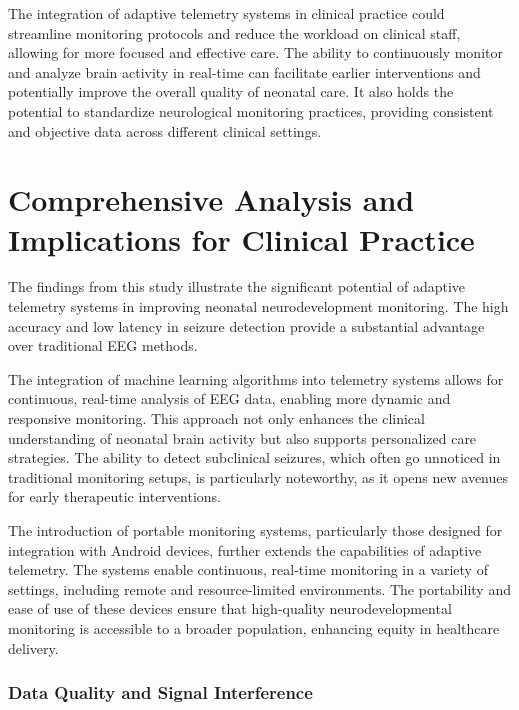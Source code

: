 \documentclass[12pt,journal,compsoc]{IEEEtran}
\begin{document}
The integration of adaptive telemetry systems in clinical practice could streamline monitoring protocols and reduce the workload on clinical staff, allowing for more focused and effective care. The ability to continuously monitor and analyze brain activity in real-time can facilitate earlier interventions and potentially improve the overall quality of neonatal care. It also holds the potential to standardize neurological monitoring practices, providing consistent and objective data across different clinical settings. 

\section{Comprehensive Analysis and Implications for Clinical Practice}

The findings from this study illustrate the significant potential of adaptive telemetry systems in improving neonatal neurodevelopment monitoring. The high accuracy and low latency in seizure detection provide a substantial advantage over traditional EEG methods.  

The integration of machine learning algorithms into telemetry systems allows for continuous, real-time analysis of EEG data, enabling more dynamic and responsive monitoring. This approach not only enhances the clinical understanding of neonatal brain activity but also supports personalized care strategies. The ability to detect subclinical seizures, which often go unnoticed in traditional monitoring setups, is particularly noteworthy, as it opens new avenues for early therapeutic interventions.

The introduction of portable monitoring systems, particularly those designed for integration with Android devices, further extends the capabilities of adaptive telemetry. The systems enable continuous, real-time monitoring in a variety of settings, including remote and resource-limited environments. The portability and ease of use of these devices ensure that high-quality neurodevelopmental monitoring is accessible to a broader population, enhancing equity in healthcare delivery.

\subsubsection{Data Quality and Signal Interference}
\end{document}
